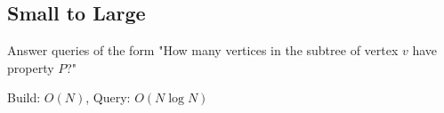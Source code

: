 \subsection{Small to Large}
Answer queries of the form "How many vertices in the subtree of vertex $v$ have property $P$?"

Build: $O(N)$, Query: $O(N \log N)$
